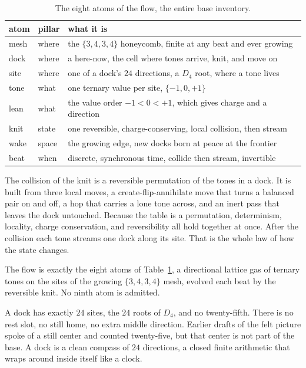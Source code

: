 \begin{table}[ht]
\centering
\begin{tabular}{@{}lll@{}}
\toprule
atom & pillar & what it is \\
\midrule
mesh & where & the $\{3,4,3,4\}$ honeycomb, finite at any beat and ever growing \\
dock & where & a here-now, the cell where tones arrive, knit, and move on \\
site & where & one of a dock's $24$ directions, a $D_4$ root, where a tone lives \\
tone & what & one ternary value per site, $\{-1, 0, +1\}$ \\
lean & what & the value order $-1 < 0 < +1$, which gives charge and a direction \\
knit & state & one reversible, charge-conserving, local collision, then stream \\
wake & space & the growing edge, new docks born at peace at the frontier \\
beat & when & discrete, synchronous time, collide then stream, invertible \\
\bottomrule
\end{tabular}
\caption{The eight atoms of the flow, the entire base inventory.}
\label{tab:eight-atoms}
\end{table}

The collision of the knit is a reversible permutation of the tones in a dock. It is built from three local moves, a create-flip-annihilate move that turns a balanced pair on and off, a hop that carries a lone tone across, and an inert pass that leaves the dock untouched. Because the table is a permutation, determinism, locality, charge conservation, and reversibility all hold together at once. After the collision each tone streams one dock along its site. That is the whole law of how the state changes.

\begin{axiom}
The flow is exactly the eight atoms of Table~\ref{tab:eight-atoms}, a directional lattice gas of ternary tones on the sites of the growing $\{3,4,3,4\}$ mesh, evolved each beat by the reversible knit. No ninth atom is admitted.
\end{axiom}

A dock has exactly $24$ sites, the $24$ roots of $D_4$, and no twenty-fifth. There is no rest slot, no still home, no extra middle direction. Earlier drafts of the felt picture spoke of a still center and counted twenty-five, but that center is not part of the base. A dock is a clean compass of $24$ directions, a closed finite arithmetic that wraps around inside itself like a clock.

